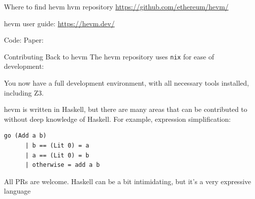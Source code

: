 \documentclass[aspectratio=169]{beamer}
\begin{document}
\begin{frame}[fragile=singleslide]{Where to find hevm}
hvm repository  \url{https://github.com/ethereum/hevm/}

hevm user guide: \url{https://hevm.dev/}
\bigskip

Code: \qquad {}
\qquad \qquad \qquad Paper: \qquad {}
\end{frame}

\begin{frame}[fragile=singleslide]{Contributing Back to hevm}
The hevm repository uses \texttt{nix} for ease of development:

You now have a full development environment, with all necessary tools
installed, including Z3.
\bigskip

hevm is written in Haskell, but there are many areas that can be contributed to
without deep knowledge of Haskell. For example, expression simplification:

\begin{Verbatim}[frame=single, framerule=0.2mm, framesep=2mm,fontsize=\footnotesize]
    go (Add a b)
      | b == (Lit 0) = a
      | a == (Lit 0) = b
      | otherwise = add a b
\end{Verbatim}

All PRs are welcome. Haskell can be a bit intimidating, but it's a very expressive language
\end{frame}



\end{document}
